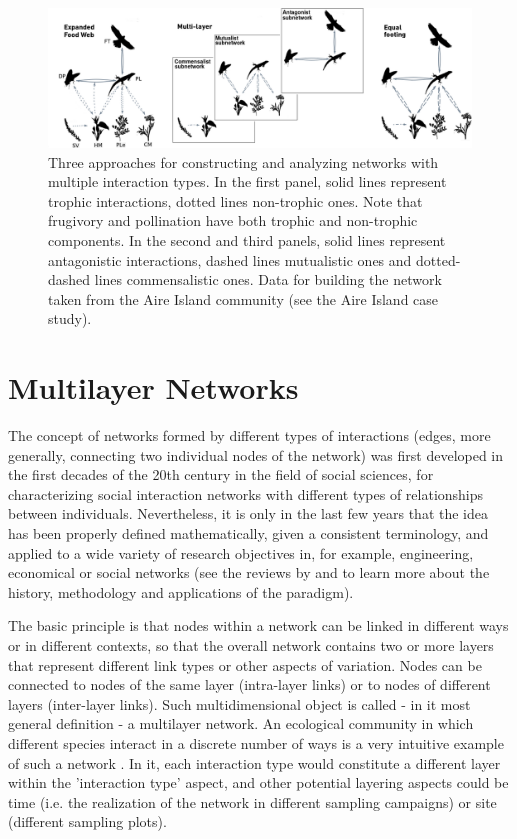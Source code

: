 \begin{figure}[ht]
\centering
\includegraphics[width=\textwidth]{./Figures/chapter02/Fig_1.png}
\caption[Three approaches for multiple interactions networks]{\color{Gray} Three approaches for constructing and analyzing networks with multiple interaction types. In the first panel, solid lines represent trophic interactions, dotted lines non-trophic ones. Note that frugivory and pollination have both trophic and non-trophic components. In the second and third panels, solid lines represent antagonistic interactions, dashed lines mutualistic ones and dotted-dashed lines commensalistic ones. Data for building the network taken from the Aire Island community (see the Aire Island case study).}
\label{fig:fig2.1}
\end{figure}

\section{Multilayer Networks}
The concept of networks formed by different types of interactions (edges, more generally, connecting two individual nodes of the network) was first developed in the first decades of the 20th century in the field of social sciences, for characterizing social interaction networks with different types of relationships between individuals. Nevertheless, it is only in the last few years that the idea has been properly defined mathematically, given a consistent terminology, and applied to a wide variety of research objectives in, for example, engineering, economical or social networks (see the reviews by \citealt{Boccaletti2014} and \citealt{Kivela2014} to learn more about the history, methodology and applications of the paradigm).

The basic principle is that nodes within a network can be linked in different ways or in different contexts, so that the overall network contains two or more layers that represent different link types or other aspects of variation. Nodes can be connected to nodes of the same layer (intra-layer links) or to nodes of different layers (inter-layer links). Such multidimensional object is called - in it most general definition - a multilayer network. An ecological community in which different species interact in a discrete number of ways is a very intuitive example of such a network \citep{Pilosof2017}. In it, each interaction type would constitute a different layer within the {}'interaction type{}' aspect, and other potential layering aspects could be time (i.e. the realization of the network in different sampling campaigns) or site (different sampling plots).

